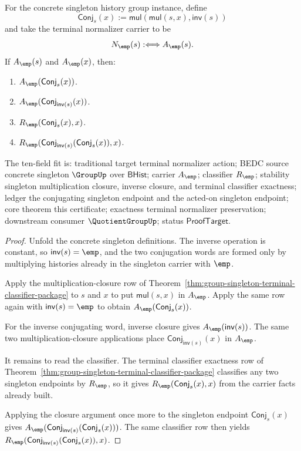 \begin{theorem}
\label{thm:group-singleton-normalizer-action-certificate}
For the concrete singleton history group instance, define
$$
\mathsf{Conj}_s(x):=\mathsf{mul}(\mathsf{mul}(s,x),\mathsf{inv}(s))
$$
and take the terminal normalizer carrier to be
$$
N_{\emp}(s):\Longleftrightarrow A_{\emp}(s).
$$
If $A_{\emp}(s)$ and $A_{\emp}(x)$, then:
\begin{enumerate}
\item $A_{\emp}(\mathsf{Conj}_s(x))$.
\item $A_{\emp}(\mathsf{Conj}_{\mathsf{inv}(s)}(x))$.
\item $R_{\emp}(\mathsf{Conj}_s(x),x)$.
\item $R_{\emp}(\mathsf{Conj}_{\mathsf{inv}(s)}
(\mathsf{Conj}_s(x)),x)$.
\end{enumerate}
The ten-field fit is: traditional target terminal normalizer action; BEDC
source concrete singleton $\GroupUp$ over $\mathsf{BHist}$; carrier
$A_{\emp}$; classifier $R_{\emp}$; stability singleton multiplication
closure, inverse closure, and terminal classifier exactness; ledger the
conjugating singleton endpoint and the acted-on singleton endpoint; core
theorem this certificate; exactness terminal normalizer preservation;
downstream consumer $\QuotientGroupUp$; status $\mathsf{ProofTarget}$.
\end{theorem}
\begin{proof}
Unfold the concrete singleton definitions. The inverse operation is constant,
so $\mathsf{inv}(s)=\emp$, and the two conjugation words are formed only by
multiplying histories already in the singleton carrier with $\emp$.

Apply the multiplication-closure row of
Theorem~\ref{thm:group-singleton-terminal-classifier-package} to $s$ and $x$ to put
$\mathsf{mul}(s,x)$ in $A_{\emp}$. Apply the same row again with
$\mathsf{inv}(s)=\emp$ to obtain
$A_{\emp}(\mathsf{Conj}_s(x))$.

For the inverse conjugating word, inverse closure gives
$A_{\emp}(\mathsf{inv}(s))$. The same two multiplication-closure applications
place $\mathsf{Conj}_{\mathsf{inv}(s)}(x)$ in $A_{\emp}$.

It remains to read the classifier. The terminal classifier exactness row of
Theorem~\ref{thm:group-singleton-terminal-classifier-package} classifies any two
singleton endpoints by $R_{\emp}$, so it gives
$R_{\emp}(\mathsf{Conj}_s(x),x)$ from the carrier facts already built.

Applying the closure argument once more to the singleton endpoint
$\mathsf{Conj}_s(x)$ gives
$A_{\emp}(\mathsf{Conj}_{\mathsf{inv}(s)}(\mathsf{Conj}_s(x)))$. The same
classifier row then yields
$R_{\emp}(\mathsf{Conj}_{\mathsf{inv}(s)}(\mathsf{Conj}_s(x)),x)$.
\end{proof}


